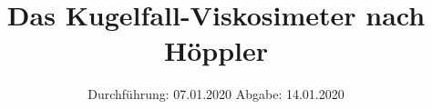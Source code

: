 

\subject{Versuch 107}
\title{Das Kugelfall-Viskosimeter nach Höppler}
\date{%
  Durchführung: 07.01.2020
  \hspace{3em}
  Abgabe: 14.01.2020
}


\setlength{\parindent}{0pt} %

\maketitle
\thispagestyle{empty}
\tableofcontents
\newpage



%




\printbibliography{}


